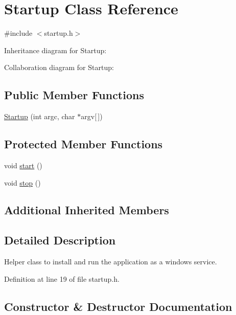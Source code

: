 \hypertarget{class_startup}{}\section{Startup Class Reference}
\label{class_startup}


{\ttfamily \#include $<$startup.\+h$>$}



Inheritance diagram for Startup\+:


Collaboration diagram for Startup\+:
\subsection*{Public Member Functions}
\begin{DoxyCompactItemize}
\item 
\mbox{\hyperlink{class_startup_a03052d5e10da95f47d0f005d615ef89f}{Startup}} (int argc, char $\ast$argv\mbox{[}$\,$\mbox{]})
\end{DoxyCompactItemize}
\subsection*{Protected Member Functions}
\begin{DoxyCompactItemize}
\item 
void \mbox{\hyperlink{class_startup_abdcf9eed41611ee15a59ed00dc2fc2d8}{start}} ()
\item 
void \mbox{\hyperlink{class_startup_a7c9c2aff06377779ce1f801836bd11b3}{stop}} ()
\end{DoxyCompactItemize}
\subsection*{Additional Inherited Members}


\subsection{Detailed Description}
Helper class to install and run the application as a windows service. 

Definition at line 19 of file startup.\+h.



\subsection{Constructor \& Destructor Documentation}
\mbox{\label{class_startup_a03052d5e10da95f47d0f005d615ef89f}} 
